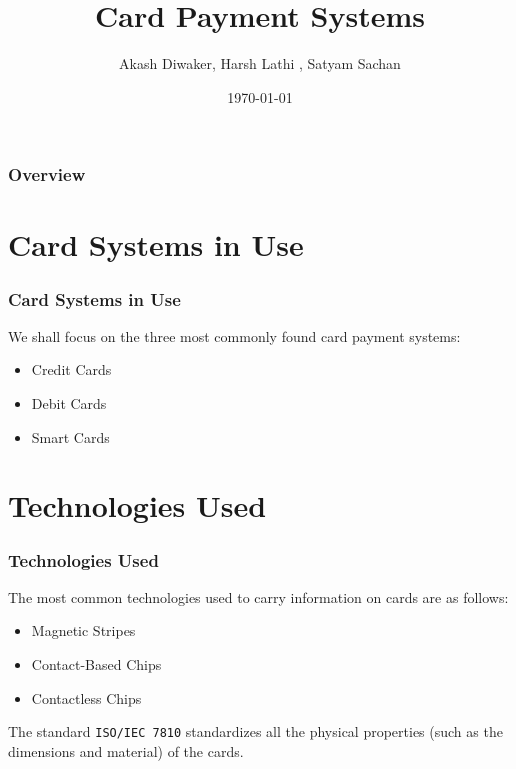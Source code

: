 \documentclass{beamer}
\title[Card Payment Systems]{Card Payment Systems} %
\author{Akash Diwaker, Harsh Lathi	, Satyam Sachan} %
\institute[IIT Bhilai] %
{
IIT Bhilai \\ %
\medskip
}
\date{\today} %
\begin{document}
	\begin{frame}
	\titlepage 
	\end{frame}
	
	\begin{frame}
		\frametitle{Overview} %
		\tableofcontents %
	\end{frame}
	
	\section{Card Systems in Use}
	\begin{frame}
		\frametitle{Card Systems in Use}
		We shall focus on the three most commonly found card payment systems:\\
		
		\begin{itemize}
			\item Credit Cards
			\item Debit Cards
			\item Smart Cards
		\end{itemize}
		
	\end{frame}
	
	\section{Technologies Used}
	
	\begin{frame}
		\frametitle{Technologies Used}
		The most common technologies used to carry information on cards are as follows:
		\begin{itemize}
			\item Magnetic Stripes
			\item Contact-Based Chips
			\item Contactless Chips
		\end{itemize}
		The standard \texttt{ISO/IEC 7810} standardizes all the physical properties (such as the dimensions and material) of the cards.
	\end{frame}
	
\end{document}
